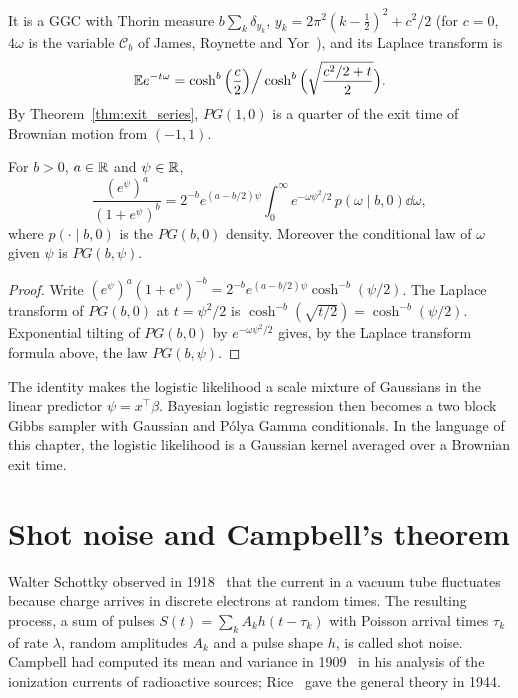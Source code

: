 It is a GGC with Thorin measure $b\sum_k\delta_{y_k}$, $y_k = 2\pi^2(k-\frac12)^2 + c^2/2$ (for $c=0$, $4\omega$ is the variable $\mathcal C_b$ of James, Roynette and Yor~\cite[Section~1.6]{jamesroynetteyor2008}), and its Laplace transform is
\[
\mathbb{E} e^{-t\omega} = \cosh^b\Big(\frac c2\Big)\Big/\cosh^b\Big(\sqrt{\frac{c^2/2+t}{2}}\Big).
\]
By Theorem~\ref{thm:exit_series}, $PG(1,0)$ is a quarter of the exit time of Brownian motion from $(-1,1)$.

\begin{theorem}
\label{thm:pg_identity}
For $b>0$, $a\in\mathbb{R}$ and $\psi\in\mathbb{R}$,
\[
\frac{(e^{\psi})^a}{(1+e^\psi)^b} = 2^{-b}e^{(a-b/2)\psi}\int_0^\infty e^{-\omega\psi^2/2}\,p(\omega\mid b,0)\dd\omega,
\]
where $p(\cdot\mid b,0)$ is the $PG(b,0)$ density. Moreover the conditional law of $\omega$ given $\psi$ is $PG(b,\psi)$.
\end{theorem}

\begin{proof}
Write $(e^\psi)^a(1+e^\psi)^{-b} = 2^{-b}e^{(a-b/2)\psi}\cosh^{-b}(\psi/2)$. The Laplace transform of $PG(b,0)$ at $t = \psi^2/2$ is $\cosh^{-b}(\sqrt{t/2}) = \cosh^{-b}(\psi/2)$. Exponential tilting of $PG(b,0)$ by $e^{-\omega\psi^2/2}$ gives, by the Laplace transform formula above, the law $PG(b,\psi)$.
\end{proof}

The identity makes the logistic likelihood a scale mixture of Gaussians in the linear predictor $\psi = x^\top\beta$. Bayesian logistic regression then becomes a two block Gibbs sampler with Gaussian and P\'olya Gamma conditionals. In the language of this chapter, the logistic likelihood is a Gaussian kernel averaged over a Brownian exit time.

\section{Shot noise and Campbell's theorem}

Walter Schottky observed in 1918~\cite{schottky1918} that the current in a vacuum tube fluctuates because charge arrives in discrete electrons at random times. The resulting process, a sum of pulses $S(t) = \sum_k A_k h(t-\tau_k)$ with Poisson arrival times $\tau_k$ of rate $\lambda$, random amplitudes $A_k$ and a pulse shape $h$, is called shot noise. Campbell had computed its mean and variance in 1909~\cite{campbell1909} in his analysis of the ionization currents of radioactive sources; Rice~\cite{rice1944} gave the general theory in 1944.

